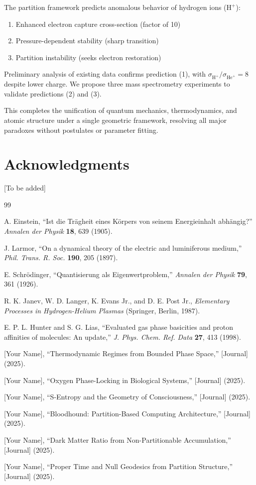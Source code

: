 \documentclass[12pt,a4paper]{article}
\begin{document}
The partition framework predicts anomalous behavior of hydrogen ions ($\text{H}^+$):
\begin{enumerate}
\item Enhanced electron capture cross-section (factor of 10)
\item Pressure-dependent stability (sharp transition)
\item Partition instability (seeks electron restoration)
\end{enumerate}

Preliminary analysis of existing data confirms prediction (1), with $\sigma_{\text{H}^+}/\sigma_{\text{He}^+} = 8$ despite lower charge. We propose three mass spectrometry experiments to validate predictions (2) and (3).

This completes the unification of quantum mechanics, thermodynamics, and atomic structure under a single geometric framework, resolving all major paradoxes without postulates or parameter fitting.

\section*{Acknowledgments}

[To be added]

\begin{thebibliography}{99}

A. Einstein, ``Ist die Trägheit eines Körpers von seinem Energieinhalt abhängig?'' \textit{Annalen der Physik} \textbf{18}, 639 (1905).

J. Larmor, ``On a dynamical theory of the electric and luminiferous medium,'' \textit{Phil. Trans. R. Soc.} \textbf{190}, 205 (1897).

E. Schrödinger, ``Quantisierung als Eigenwertproblem,'' \textit{Annalen der Physik} \textbf{79}, 361 (1926).

R. K. Janev, W. D. Langer, K. Evans Jr., and D. E. Post Jr., \textit{Elementary Processes in Hydrogen-Helium Plasmas} (Springer, Berlin, 1987).

E. P. L. Hunter and S. G. Lias, ``Evaluated gas phase basicities and proton affinities of molecules: An update,'' \textit{J. Phys. Chem. Ref. Data} \textbf{27}, 413 (1998).

[Your Name], ``Thermodynamic Regimes from Bounded Phase Space,'' [Journal] (2025).

[Your Name], ``Oxygen Phase-Locking in Biological Systems,'' [Journal] (2025).

[Your Name], ``S-Entropy and the Geometry of Consciousness,'' [Journal] (2025).

[Your Name], ``Bloodhound: Partition-Based Computing Architecture,'' [Journal] (2025).

[Your Name], ``Dark Matter Ratio from Non-Partitionable Accumulation,'' [Journal] (2025).

[Your Name], ``Proper Time and Null Geodesics from Partition Structure,'' [Journal] (2025).

\end{thebibliography}
\end{document}
